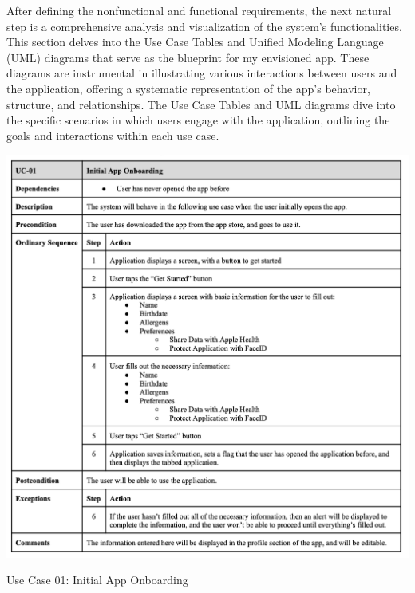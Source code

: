 After defining the nonfunctional and functional requirements, the next natural step is a comprehensive analysis and visualization of the system's functionalities. This section delves into the Use Case Tables and Unified Modeling Language (UML) diagrams that serve as the blueprint for my envisioned app. These diagrams are instrumental in illustrating various interactions between users and the application, offering a systematic representation of the app's behavior, structure, and relationships. The Use Case Tables and UML diagrams dive into the specific scenarios in which users engage with the application, outlining the goals and interactions within each use case.

% 
% 

\begin{table} [H]
    \centering
    \includegraphics[width=1\linewidth]{thesis//chapters//images/uc-01.png}
    \caption{Use Case 01: Initial App Onboarding}
    \label{fig:uc01-table}
\end{table}

